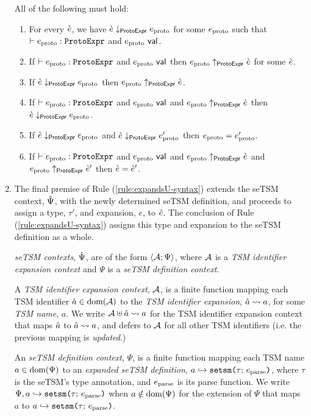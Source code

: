 \begin{enumerate}
\begingroup 
\def\thetheorem{\ref{condition:proto-expression-isomorphism}}
\begin{condition} All of the following must hold:
\begin{enumerate}
\item For every $\grave{e}$, we have $\grave{e} \downarrow_\mathsf{ProtoExpr} e_\text{proto}$ for some $e_\text{proto}$ such that $\vdash e_\text{proto} : \mathtt{ProtoExpr}$ and $e_\text{proto}~\mathsf{val}$.
\item If $\vdash e_\text{proto} : \mathtt{ProtoExpr}$ and $e_\text{proto}~\mathsf{val}$ then $e_\text{proto} \uparrow_\mathsf{ProtoExpr} \grave{e}$ for some $\grave{e}$.
\item If $\grave{e} \downarrow_\mathsf{ProtoExpr} e_\text{proto}$ then $e_\text{proto} \uparrow_\mathsf{ProtoExpr} \grave{e}$.
\item If $\vdash e_\text{proto} : \mathtt{ProtoExpr}$ and $e_\text{proto}~\mathsf{val}$ and $e_\text{proto} \uparrow_\mathsf{ProtoExpr} \grave{e}$ then $\grave{e} \downarrow_\mathsf{ProtoExpr} e_\text{proto}$.
\item If $\grave{e} \downarrow_\mathsf{ProtoExpr} e_\text{proto}$ and $\grave{e} \downarrow_\mathsf{ProtoExpr} e_\text{proto}'$ then $e_\text{proto}=e_\text{proto}'$.
\item If $\vdash e_\text{proto} : \mathtt{ProtoExpr}$ and $e_\text{proto}~\mathsf{val}$ and $e_\text{proto} \uparrow_\mathsf{ProtoExpr} \grave{e}$ and $e_\text{proto} \uparrow_\mathsf{ProtoExpr} \grave{e}'$ then $\grave{e}=\grave{e}'$.
\end{enumerate}
\end{condition}
\endgroup

\item The final premise of Rule (\ref{rule:expandsU-syntax}) extends the seTSM context, $\hat{\Psi}$, with the newly determined {seTSM definition}, and proceeds to assign a type, $\tau'$, and expansion, $e$, to ${\hat e}$. The conclusion of Rule (\ref{rule:expandsU-syntax}) assigns this type and expansion to the seTSM definition as a whole.%



\emph{seTSM contexts}, $\hat{\Psi}$, are of the form $\langle \mathcal{A}; \Psi \rangle$, where $\mathcal{A}$ is a \emph{TSM identifier expansion context} and $\Psi$ is a \emph{seTSM definition context}. 

A \emph{TSM identifier expansion context}, $\mathcal{A}$, is a finite function mapping each TSM identifier $\hat{a} \in \text{dom}(\mathcal{A})$ to the \emph{TSM identifier expansion}, $\hat{a} \leadsto a$, for some \emph{TSM name}, $a$. We write $\mathcal{A} \uplus \hat{a} \leadsto a$ for the TSM identifier expansion context that maps $\hat{a}$ to $\hat{a} \leadsto a$, and defers to $\mathcal{A}$ for all other TSM identifiers (i.e. the previous mapping is \emph{updated}.)

An \emph{seTSM definition context}, $\Psi$, is a finite function mapping each TSM name $a \in \text{dom}(\Psi)$ to an \emph{expanded seTSM definition}, $a \hookrightarrow \texttt{setsm}\texttt{(}\tau;\,e_\text{parse}\texttt{)}$, where $\tau$ is the seTSM's type annotation, and $e_\text{parse}$ is its parse function. We write $\Psi, a \hookrightarrow \texttt{setsm}\texttt{(}\tau;\,e_\text{parse}\texttt{)}$ when $a \notin \text{dom}(\Psi)$ for the extension of $\Psi$ that maps $a$ to $a \hookrightarrow \texttt{setsm}\texttt{(}\tau;\,e_\text{parse}\texttt{)}$. %


\end{enumerate}
